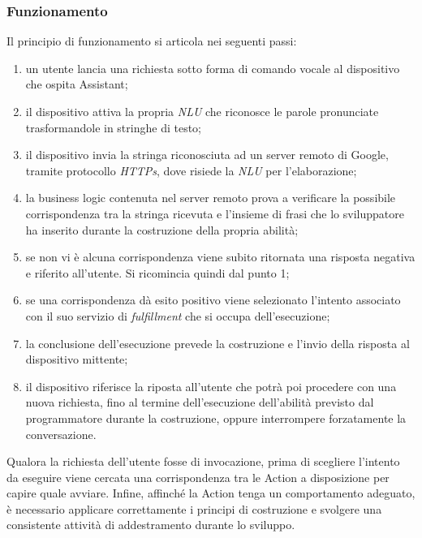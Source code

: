 		\subsubsection{Funzionamento}
		Il principio di funzionamento si articola nei seguenti passi:
		\begin{enumerate}
			\item un utente lancia una richiesta sotto forma di comando vocale al dispositivo che ospita Assistant;
			\item il dispositivo attiva la propria \textit{NLU} che riconosce le parole pronunciate trasformandole in stringhe di testo;
			\item il dispositivo invia la stringa riconosciuta ad un server remoto di Google, tramite protocollo \textit{HTTPs}, dove risiede la \textit{NLU} per l'elaborazione;
			\item la business logic contenuta nel server remoto prova a verificare la possibile corrispondenza tra la stringa ricevuta e l'insieme di frasi che lo sviluppatore ha inserito durante la costruzione della propria abilità;
			\item se non vi è alcuna corrispondenza viene subito ritornata una risposta negativa e riferito all'utente. Si ricomincia quindi dal punto 1;
			\item se una corrispondenza dà esito positivo viene selezionato l'intento associato con il suo servizio di \textit{fulfillment} che si occupa dell'esecuzione;
			\item la conclusione dell'esecuzione prevede la costruzione e l'invio della risposta al dispositivo mittente;
			\item il dispositivo riferisce la riposta all'utente che potrà poi procedere con una nuova richiesta, fino al termine dell'esecuzione dell'abilità previsto dal programmatore durante la costruzione, oppure interrompere forzatamente la conversazione.
		\end{enumerate}
		Qualora la richiesta dell'utente fosse di invocazione, prima di scegliere l'intento da eseguire viene cercata una corrispondenza tra le Action a disposizione per capire quale avviare.
		Infine, affinché la Action tenga un comportamento adeguato, è necessario applicare correttamente i principi di costruzione e svolgere una consistente attività di addestramento durante lo sviluppo.
